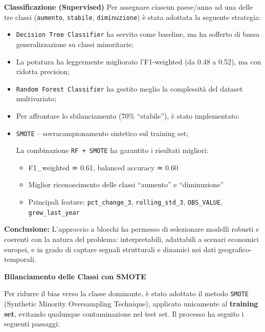 \documentclass[conference]{IEEEtran}
\begin{document}
\vspace{0.5em} \noindent\textbf{Classificazione (Supervised)} Per assegnare ciascun paese/anno ad una delle tre classi (\texttt{aumento}, \texttt{stabile}, \texttt{diminuzione}) è stata adottata la seguente strategia:

\begin{itemize} \item \texttt{Decision Tree Classifier} ha servito come baseline, ma ha sofferto di bassa generalizzazione su classi minoritarie; \item La potatura ha leggermente migliorato l’F1-weighted (da 0.48 a 0.52), ma con ridotta precision; \item \texttt{Random Forest Classifier} ha gestito meglio la complessità del dataset multivariato; \item Per affrontare lo sbilanciamento (70\% “stabile”), è stato implementato:  \item \texttt{SMOTE} – sovracampionamento sintetico sul training set; 

La combinazione \texttt{RF + SMOTE} ha garantito i risultati migliori:

{\raggedright
\begin{itemize} 
    \item F1\_weighted ≃ 0.61, balanced accuracy ≃ 0.60 
    \item Miglior riconoscimento delle classi “aumento” e “diminuzione” 
    \item Principali feature: \texttt{pct\_change\_3}, \texttt{rolling\_std\_3}, \texttt{OBS\_VALUE}, \texttt{grew\_last\_year} 
\end{itemize}
}
\end{itemize}

\vspace{0.5em} \noindent\textbf{Conclusione:} L’approccio a blocchi ha permesso di selezionare modelli robusti e coerenti con la natura del problema: interpretabili, adattabili a scenari economici europei, e in grado di captare segnali strutturali e dinamici nei dati geografico-temporali.

\vspace{1em}\noindent\textbf{Bilanciamento delle Classi con SMOTE}

Per ridurre il bias verso la classe dominante, è stato adottato il metodo \texttt{SMOTE} (Synthetic Minority Oversampling Technique), applicato unicamente al \textbf{training set}, evitando qualunque contaminazione nel test set. Il processo ha seguito i seguenti passaggi:
\end{document}
